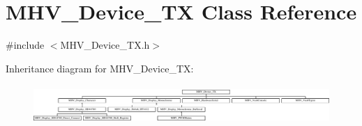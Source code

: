 \hypertarget{class_m_h_v___device___t_x}{
\section{\-M\-H\-V\-\_\-\-Device\-\_\-\-T\-X \-Class \-Reference}
\label{class_m_h_v___device___t_x}
}


{\ttfamily \#include $<$\-M\-H\-V\-\_\-\-Device\-\_\-\-T\-X.\-h$>$}

\-Inheritance diagram for \-M\-H\-V\-\_\-\-Device\-\_\-\-T\-X\-:\begin{figure}[H]
\begin{center}
\leavevmode
\includegraphics[height=1.475626cm]{class_m_h_v___device___t_x}
\end{center}
\end{figure}
